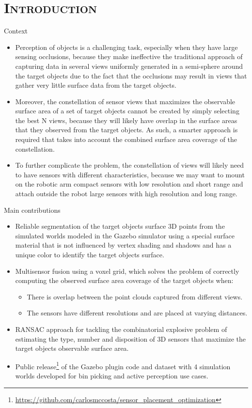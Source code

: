 \section{\scshape Introduction}\label{sec:introduction}

\begin{frame}{Context}
	\begin{itemize}
		\item Perception of objects is a challenging task, especially when they have large sensing occlusions, because they make ineffective the traditional approach of capturing data in several views uniformly generated in a semi-sphere around the target objects due to the fact that the occlusions may result in views that gather very little surface data from the target objects.
		\item Moreover, the constellation of sensor views that maximizes the observable surface area of a set of target objects cannot be created by simply selecting the best N views, because they will likely have overlap in the surface areas that they observed from the target objects. As such, a smarter approach is required that takes into account the combined surface area coverage of the constellation.
		\item To further complicate the problem, the constellation of views will likely need to have sensors with different characteristics, because we may want to mount on the robotic arm compact sensors with low resolution and short range and attach outside the robot large sensors with high resolution and long range.
	\end{itemize}
\end{frame}


\begin{frame}{Main contributions}
	\begin{itemize}
		\item Reliable segmentation of the target objects surface 3D points from the simulated worlds modeled in the Gazebo simulator using a special surface material that is not influenced by vertex shading and shadows and has a unique color to identify the target objects surface.
		\item Multisensor fusion using a voxel grid, which solves the problem of correctly computing the observed surface area coverage of the target objects when:
		\begin{itemize}
				\item There is overlap between the point clouds captured from different views.
				\item The sensors have different resolutions and are placed at varying distances.
		\end{itemize}
		\item RANSAC approach for tackling the combinatorial explosive problem of estimating the type, number and disposition of 3D sensors that maximize the target objects observable surface area.
		\item Public release\footnote{\scriptsize\url{https://github.com/carlosmccosta/sensor_placement_optimization}} of the Gazebo plugin code and dataset with 4 simulation worlds developed for bin picking and active perception use cases.
	\end{itemize}
\end{frame}

